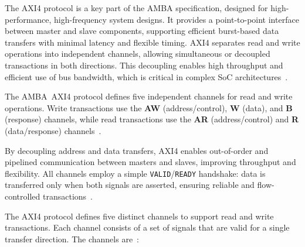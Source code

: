The \ac{AXI4} protocol is a key part of the AMBA specification, designed for high-performance, high-frequency system designs. It provides a point-to-point interface between master and slave components, supporting efficient burst-based data transfers with minimal latency and flexible timing. AXI4 separates read and write operations into independent channels, allowing simultaneous or decoupled transactions in both directions. This decoupling enables high throughput and efficient use of bus bandwidth, which is critical in complex SoC architectures~\cite{arm_ltd_introduction_2020}.

\iffalse
\sh{AXI4-Lite and AXI4-Stream}
AXI4-Lite is a simplified subset of AXI4, supporting only single, non-burst transactions. It is primarily used for register access and control/status registers, where low complexity and minimal logic overhead are preferred~\cite{arm_amba_2021}.

Unlike AXI4 and AXI4-Lite, AXI4-Stream is designed for unidirectional, high-throughput data streaming without address phases. It is optimized for continuous data flow, commonly used in interfaces such as FIFO transfers, DSP data paths, or serial communication modules. The protocol uses \texttt{TVALID}, \texttt{TREADY}, and sideband signals like \texttt{TLAST} to mark packet boundaries~\cite{arm_amba_2021-1}.
\fi

The AMBA~AXI4 protocol defines five independent channels for read and write operations. Write transactions use the \textbf{AW} (address/control), \textbf{W} (data), and \textbf{B} (response) channels, while read transactions use the \textbf{AR} (address/control) and \textbf{R} (data/response) channels~\cite{arm_ltd_introduction_2020}. 

By decoupling address and data transfers, AXI4 enables out-of-order and pipelined communication between masters and slaves, improving throughput and flexibility. All channels employ a simple \texttt{VALID}/\texttt{READY} handshake: data is transferred only when both signals are asserted, ensuring reliable and flow-controlled transactions~\cite{arm_ltd_introduction_2020}.

\iffalse
The AXI4 protocol defines five distinct channels to support read and write transactions. Each channel consists of a set of signals that are valid for a single transfer direction. The channels are~\cite{arm_ltd_introduction_2020}:

